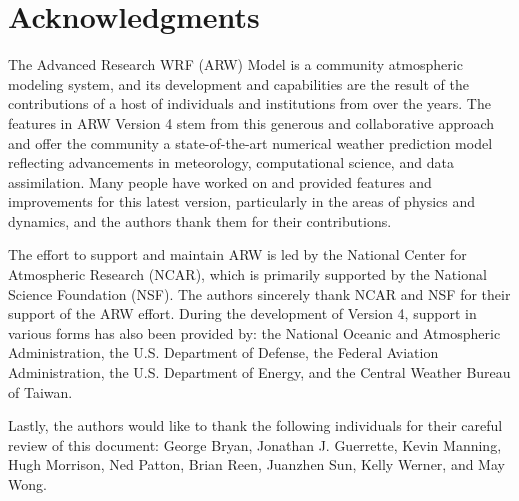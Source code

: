 \chapter*{Acknowledgments}

\hskip 15pt 
The Advanced Research WRF (ARW) Model is a community 
atmospheric modeling system, and its development and capabilities 
are the result of the contributions of a host of individuals and 
institutions from over the years.  The features in ARW Version 4 
stem from this generous and collaborative approach and offer the community 
a state-of-the-art numerical weather prediction model reflecting 
advancements in meteorology, computational science, and
data assimilation.  Many people have worked on and provided 
features and improvements for this latest version, particularly in 
the areas of physics and dynamics, and the authors thank them for 
their contributions.

\vskip 10pt
The effort to support and maintain ARW is led by the National Center for 
Atmospheric Research (NCAR), which is primarily supported by the National Science 
Foundation (NSF).  The authors sincerely thank NCAR and NSF for their support of 
the ARW effort.  During the development of Version 4, support 
in various forms has also been provided by: the National Oceanic 
and Atmospheric Administration, the U.S. Department of Defense, the
Federal Aviation Administration, the U.S. Department of Energy, and
the Central Weather Bureau of Taiwan.

\vskip 10pt
Lastly, the authors would like to thank the following individuals for their 
careful review of this document: George Bryan, Jonathan J. Guerrette, 
Kevin Manning, Hugh Morrison, Ned Patton, Brian Reen, Juanzhen Sun, 
Kelly Werner, and May Wong.



